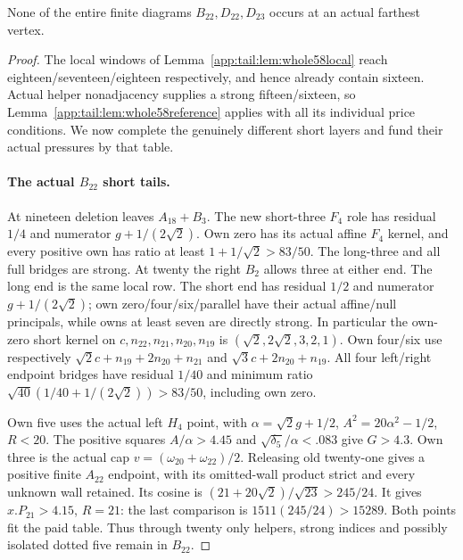 \begin{proposition}
\label{app:tail:prop:whole58}
None of the entire finite diagrams $B_{22},D_{22},D_{23}$ occurs at
an actual farthest vertex.
\end{proposition}
\begin{proof}
The local windows of Lemma~\ref{app:tail:lem:whole58local} reach
eighteen/seventeen/eighteen respectively, and hence already contain
sixteen. Actual helper nonadjacency supplies a strong fifteen/sixteen,
so Lemma~\ref{app:tail:lem:whole58reference} applies with all its
individual price conditions. We now complete the genuinely different
short layers and fund their actual pressures by that table.

\paragraph{The actual $B_{22}$ short tails.}
At nineteen deletion leaves $A_{18}+B_3$. The new short-three $F_4$
role has residual $1/4$ and numerator $g+1/(2\sqrt2)$.
Own zero has its actual affine $F_4$ kernel, and every positive own
has ratio at least $1+1/\sqrt2>83/50$. The long-three and all full
bridges are strong. At twenty the right $B_2$ allows three at either
end. The long end is the same local row. The short end has residual
$1/2$ and numerator $g+1/(2\sqrt2)$; own zero/four/six/parallel
have their actual affine/null principals, while owns at least seven
are directly strong. In particular the own-zero short kernel on
$c,n_{22},n_{21},n_{20},n_{19}$ is
$(\sqrt2,2\sqrt2,3,2,1)$. Own four/six use respectively
$\sqrt2c+n_{19}+2n_{20}+n_{21}$ and
$\sqrt3c+2n_{20}+n_{19}$. All four left/right endpoint bridges
have residual $1/40$ and minimum ratio
$\sqrt{40}(1/40+1/(2\sqrt2))>83/50$, including own zero.

Own five uses the actual left $H_4$ point, with
$\alpha=\sqrt2g+1/2$, $A^2=20\alpha^2-1/2$, $R<20$.
The positive squares $A/\alpha>4.45$ and
$\sqrt{\delta_5}/\alpha<.083$ give $G>4.3$.
Own three is the actual cap $v=(\omega_{20}+\omega_{22})/2$.
Releasing old twenty-one gives a positive finite $A_{22}$ endpoint,
with its omitted-wall product strict and every unknown wall retained.
Its cosine is $(21+20\sqrt2)/\sqrt{23}>245/24$.
It gives $x.P_{21}>4.15$, $R=21$: the last comparison is
$1511(245/24)>15289$. Both points fit the paid table. Thus through
twenty only helpers, strong indices and possibly isolated dotted five
remain in $B_{22}$.


\end{proof}
